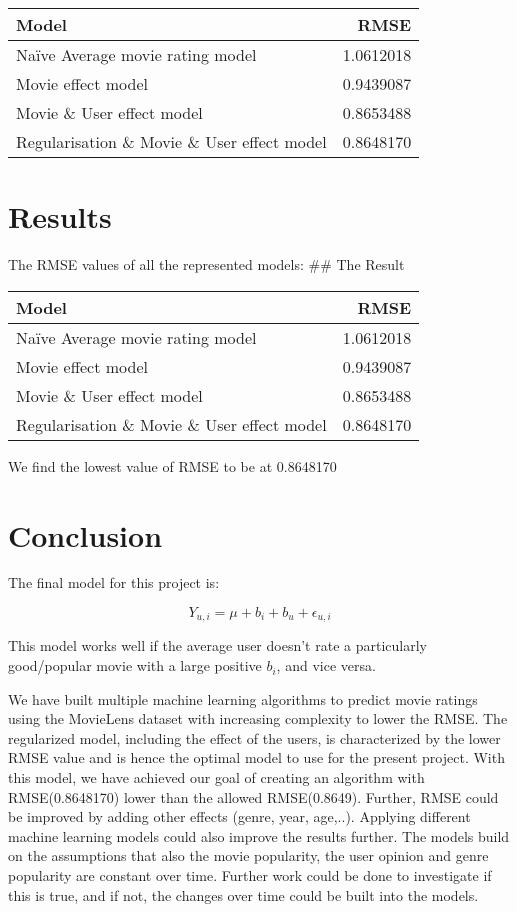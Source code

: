\documentclass[
]{article}
\begin{document}
\begin{longtable}[]{@{}lr@{}}
\toprule
Model & RMSE\tabularnewline
\midrule
\endhead
Naïve Average movie rating model & 1.0612018\tabularnewline
Movie effect model & 0.9439087\tabularnewline
Movie \& User effect model & 0.8653488\tabularnewline
Regularisation \& Movie \& User effect model & 0.8648170\tabularnewline
\bottomrule
\end{longtable}

\pagebreak

\hypertarget{results}{%
\section{Results}\label{results}}

The RMSE values of all the represented models: \#\# The Result

\begin{longtable}[]{@{}lr@{}}
\toprule
Model & RMSE\tabularnewline
\midrule
\endhead
Naïve Average movie rating model & 1.0612018\tabularnewline
Movie effect model & 0.9439087\tabularnewline
Movie \& User effect model & 0.8653488\tabularnewline
Regularisation \& Movie \& User effect model & 0.8648170\tabularnewline
\bottomrule
\end{longtable}

We find the lowest value of RMSE to be at 0.8648170

\hypertarget{conclusion}{%
\section{Conclusion}\label{conclusion}}

The final model for this project is:

\[Y_{u, i} = \mu + b_{i} + b_{u} + \epsilon_{u, i}\]

This model works well if the average user doesn't rate a particularly
good/popular movie with a large positive \(b_{i}\), and vice versa.

We have built multiple machine learning algorithms to predict movie
ratings using the MovieLens dataset with increasing complexity to lower
the RMSE. The regularized model, including the effect of the users, is
characterized by the lower RMSE value and is hence the optimal model to
use for the present project. With this model, we have achieved our goal
of creating an algorithm with RMSE(0.8648170) lower than the allowed
RMSE(0.8649). Further, RMSE could be improved by adding other effects
(genre, year, age,..). Applying different machine learning models could
also improve the results further. The models build on the assumptions
that also the movie popularity, the user opinion and genre popularity
are constant over time. Further work could be done to investigate if
this is true, and if not, the changes over time could be built into the
models.

\pagebreak
\end{document}
